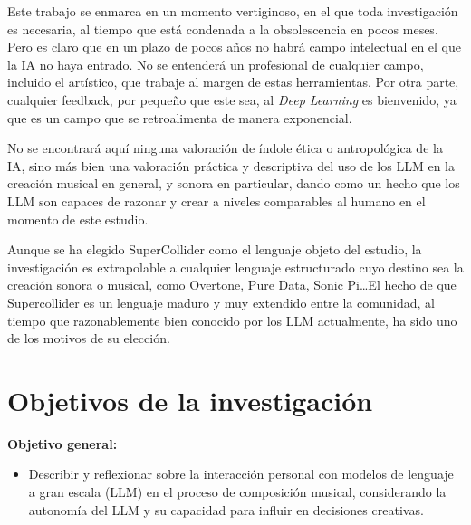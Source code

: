 Este trabajo se enmarca en un momento vertiginoso, en el que toda investigación es necesaria, al tiempo que está condenada a la obsolescencia en pocos meses. Pero es claro que en un plazo de pocos años no habrá campo intelectual en el que la IA no haya entrado. No se entenderá un profesional de cualquier campo, incluido el artístico, que trabaje al margen de estas herramientas. Por otra parte, cualquier feedback, por pequeño que este sea, al \textit{Deep Learning} es bienvenido, ya que es un campo que se retroalimenta de manera exponencial.

No se encontrará aquí ninguna valoración de índole ética o antropológica de la IA, sino más bien una valoración práctica y descriptiva del uso de los LLM en la creación musical en general, y sonora en particular, dando como un hecho que los LLM son capaces de razonar y crear a niveles comparables al humano en el momento de este estudio.

Aunque se ha elegido SuperCollider como el lenguaje objeto del estudio, la investigación es extrapolable a cualquier lenguaje estructurado cuyo destino sea la creación sonora o musical, como Overtone, Pure Data, Sonic Pi\dots El hecho de que Supercollider es un lenguaje maduro y muy extendido entre la comunidad, al tiempo que razonablemente bien conocido por los LLM actualmente, ha sido uno de los motivos de su elección.


\section{Objetivos de la investigación}

\textbf{Objetivo general:}
\begin{itemize}
    \item Describir y reflexionar sobre la interacción personal con modelos de lenguaje a gran escala (LLM) en el proceso de composición musical, considerando la autonomía del LLM y su capacidad para influir en decisiones creativas.
\end{itemize}

